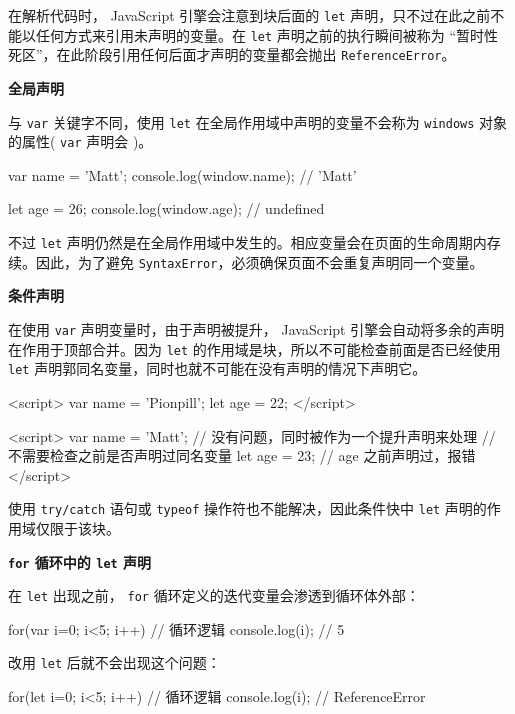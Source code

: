 在解析代码时， JavaScript 引擎会注意到块后面的 \texttt{let} 声明，只不过在此之前不能以任何方式来引用未声明的变量。在 \texttt{let} 声明之前的执行瞬间被称为 ``暂时性死区''，在此阶段引用任何后面才声明的变量都会抛出 \texttt{ReferenceError}。

\noindent\textbf{全局声明}

与 \texttt{var} 关键字不同，使用 \texttt{let} 在全局作用域中声明的变量不会称为 \texttt{windows} 对象的属性( \texttt{var} 声明会 )。

\begin{JavaScript}
var name = 'Matt';
console.log(window.name);   // 'Matt'

let age = 26;
console.log(window.age);    // undefined
\end{JavaScript}

不过 \texttt{let} 声明仍然是在全局作用域中发生的。相应变量会在页面的生命周期内存续。因此，为了避免 \texttt{SyntaxError}，必须确保页面不会重复声明同一个变量。

\noindent\textbf{条件声明}

在使用 \texttt{var} 声明变量时，由于声明被提升， JavaScript 引擎会自动将多余的声明在作用于顶部合并。因为 \texttt{let} 的作用域是块，所以不可能检查前面是否已经使用 \texttt{let} 声明郭同名变量，同时也就不可能在没有声明的情况下声明它。

\begin{JavaScript}
<script>
    var name = 'Pionpill';
    let age = 22;
</script>

<script>
    var name = 'Matt';
    // 没有问题，同时被作为一个提升声明来处理
    // 不需要检查之前是否声明过同名变量
    let age = 23;
    // age 之前声明过，报错
</script>
\end{JavaScript}

使用 \texttt{try/catch} 语句或 \texttt{typeof} 操作符也不能解决，因此条件快中 \texttt{let} 声明的作用域仅限于该块。

\noindent\textbf{\texttt{for} 循环中的 \texttt{let} 声明}

在 \texttt{let} 出现之前， \texttt{for} 循环定义的迭代变量会渗透到循环体外部：

\begin{JavaScript}
for(var i=0; i<5; i++) {
    // 循环逻辑
}
console.log(i);     // 5
\end{JavaScript}

改用 \texttt{let} 后就不会出现这个问题：

\begin{JavaScript}
for(let i=0; i<5; i++) {
    // 循环逻辑
}
console.log(i);     // ReferenceError
\end{JavaScript}


